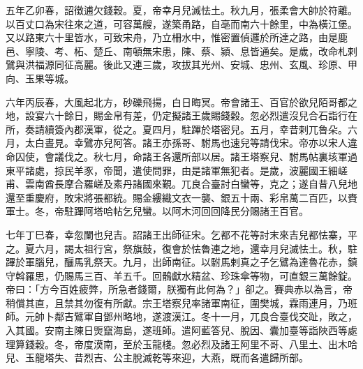 \begin{pinyinscope}
 五年乙卯春，詔徵逋欠錢穀。夏，帝幸月兒滅怯土。秋九月，張柔會大帥於符離。以百丈口為宋往來之道，可容萬艘，遂築甬路，自亳而南六十餘里，中為橫江堡。又以路東六十里皆水，可致宋舟，乃立柵水中，惟密置偵邏於所達之路，由是鹿邑、寧陵、考、柘、楚丘、南頓無宋患，陳、蔡、潁、息皆通矣。是歲，改命札剌鷿與洪福源同征高麗。後此又連三歲，攻拔其光州、安城、忠州、玄風、珍原、甲向、玉果等城。



 六年丙辰春，大風起北方，砂礫飛揚，白日晦冥。帝會諸王、百官於欲兒陌哥都之地，設宴六十餘日，賜金帛有差，仍定擬諸王歲賜錢穀。忽必烈遣沒兒合石詣行在所，奏請續簽內郡漢軍，從之。夏四月，駐蹕於塔密兒。五月，幸昔剌兀魯朵。六月，太白晝見。幸鷿亦兒阿答。諸王亦孫哥、駙馬也速兒等請伐宋。帝亦以宋人違命囚使，會議伐之。秋七月，命諸王各還所部以居。諸王塔察兒、駙馬帖裏垓軍過東平諸處，掠民羊豕，帝聞，遣使問罪，由是諸軍無犯者。是歲，波麗國王細嵯甫、雲南酋長摩合羅嵯及素丹諸國來覲。兀良合臺討白蠻等，克之；遂自昔八兒地還至重慶府，敗宋將張都統。賜金縷織文衣一襲、銀五十兩、彩帛萬二百匹，以賚軍士。冬，帝駐蹕阿塔哈帖乞兒蠻。以阿木河回回降民分賜諸王百官。



 七年丁巳春，幸忽闌也兒吉。詔諸王出師征宋。乞都不花等討末來吉兒都怯寨，平之。夏六月，謁太祖行宮，祭旗鼓，復會於怯魯連之地，還幸月兒滅怯土。秋，駐蹕於軍腦兒，釃馬乳祭天。九月，出師南征。以駙馬剌真之子乞鷿為達魯花赤，鎮守斡羅思，仍賜馬三百、羊五千。回鶻獻水精盆、珍珠傘等物，可直銀三萬餘錠。帝曰：「方今百姓疲弊，所急者錢爾，朕獨有此何為？」卻之。賽典赤以為言，帝稍償其直，且禁其勿復有所獻。宗王塔察兒率諸軍南征，圍樊城，霖雨連月，乃班師。元帥卜鄰吉鷿軍自鄧州略地，遂渡漢江。冬十一月，兀良合臺伐交趾，敗之，入其國。安南主陳日煚竄海島，遂班師。遣阿藍答兒、脫因、囊加臺等詣陜西等處理算錢穀。冬，帝度漠南，至於玉龍棧。忽必烈及諸王阿里不哥、八里土、出木哈兒、玉龍塔失、昔烈吉、公主脫滅乾等來迎，大燕，既而各遣歸所部。




\end{pinyinscope}
